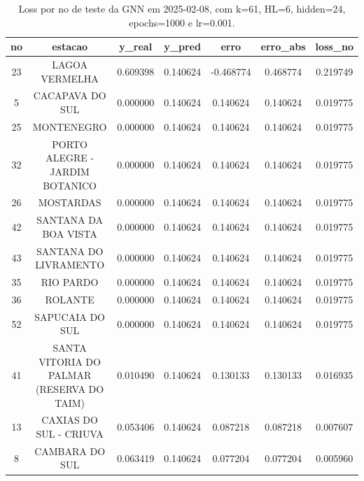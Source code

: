 \begin{table}[h]
\centering
\caption{Loss por no de teste da GNN em 2025-02-08, com k=61, HL=6, hidden=24, epochs=1000 e lr=0.001.}
\label{tab:gnn_loss_k61_hl6_h24_e1000_d20250208}
\begin{tabular}{ccccccc}
\toprule
no & estacao & y\_real & y\_pred & erro & erro\_abs & loss\_no \\
\midrule
23 & LAGOA VERMELHA & 0.609398 & 0.140624 & -0.468774 & 0.468774 & 0.219749 \\
5 & CACAPAVA DO SUL & 0.000000 & 0.140624 & 0.140624 & 0.140624 & 0.019775 \\
25 & MONTENEGRO & 0.000000 & 0.140624 & 0.140624 & 0.140624 & 0.019775 \\
32 & PORTO ALEGRE - JARDIM BOTANICO & 0.000000 & 0.140624 & 0.140624 & 0.140624 & 0.019775 \\
26 & MOSTARDAS & 0.000000 & 0.140624 & 0.140624 & 0.140624 & 0.019775 \\
42 & SANTANA DA BOA VISTA & 0.000000 & 0.140624 & 0.140624 & 0.140624 & 0.019775 \\
43 & SANTANA DO LIVRAMENTO & 0.000000 & 0.140624 & 0.140624 & 0.140624 & 0.019775 \\
35 & RIO PARDO & 0.000000 & 0.140624 & 0.140624 & 0.140624 & 0.019775 \\
36 & ROLANTE & 0.000000 & 0.140624 & 0.140624 & 0.140624 & 0.019775 \\
52 & SAPUCAIA DO SUL & 0.000000 & 0.140624 & 0.140624 & 0.140624 & 0.019775 \\
41 & SANTA VITORIA DO PALMAR (RESERVA DO TAIM) & 0.010490 & 0.140624 & 0.130133 & 0.130133 & 0.016935 \\
13 & CAXIAS DO SUL - CRIUVA & 0.053406 & 0.140624 & 0.087218 & 0.087218 & 0.007607 \\
8 & CAMBARA DO SUL & 0.063419 & 0.140624 & 0.077204 & 0.077204 & 0.005960 \\
\bottomrule
\end{tabular}
\end{table}
